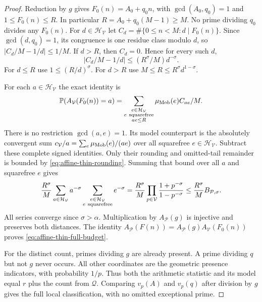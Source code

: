 \documentclass[11pt]{article}
\theoremstyle{definition}
\begin{document}
\begin{proof}
Reduction by $g$ gives $F_0(n)=A_0+q_0n$, with
$\gcd(A_0,q_0)=1$ and $1\le F_0(n)\le R$.
In particular $R=A_0+q_0(M-1)\ge M$.
No prime dividing $q_0$ divides any $F_0(n)$.
For $d\in\mathcal H_{\mathcal V}$ let
$C_d=\#\{0\le n<M:d\mid F_0(n)\}$.
Since $\gcd(d,q_0)=1$, its congruence is one residue class
modulo $d$, so $|C_d/M-1/d|\le1/M$.
If $d>R$, then $C_d=0$.  Hence for every such $d$,
\begin{equation}
 \left|C_d/M-1/d\right|
       \le (R^\sigma/M)d^{-\sigma}.
 \label{eq:affine-thin-rounding}
\end{equation}
For $d\le R$ use $1\le(R/d)^\sigma$.
For $d>R$ use $M\le R\le R^\sigma d^{1-\sigma}$.

For each $a\in\mathcal H_{\mathcal V}$ the exact identity is
\[
 \mathbb P(A_{\mathcal V}(F_0(n))=a)
  =\sum_{\substack{e\in\mathcal H_{\mathcal V}\\
                   e\ {\rm squarefree}\\ae\le R}}
           \mu_{\rm Mob}(e)C_{ae}/M .
\]
There is no restriction $\gcd(a,e)=1$.
Its model counterpart is the absolutely convergent sum
$c_{\mathcal V}/a=\sum_e\mu_{\rm Mob}(e)/(ae)$ over
all squarefree $e\in\mathcal H_{\mathcal V}$.
Subtract these complete signed identities.
Only their rounding and omitted-tail remainder is bounded by
\eqref{eq:affine-thin-rounding}.
Summing that bound over all $a$ and squarefree $e$ gives
\[
 \frac{R^\sigma}{M}
 \sum_{a\in\mathcal H_{\mathcal V}}a^{-\sigma}
 \sum_{\substack{e\in\mathcal H_{\mathcal V}\\e\ {\rm squarefree}}}
                      e^{-\sigma}
 =\frac{R^\sigma}{M}
       \prod_{p\in\mathcal V}
                  \frac{1+p^{-\sigma}}{1-p^{-\sigma}}
 \le\frac{R^\sigma}{M}B_{\mathcal P,\sigma}.
\]
All series converge since $\sigma>\alpha$.
Multiplication by $A_{\mathcal P}(g)$ is injective and preserves
both distances.
The identity
$A_{\mathcal P}(F(n))=A_{\mathcal P}(g)A_{\mathcal V}(F_0(n))$
proves \eqref{eq:affine-thin-full-budget}.

For the distinct count, primes dividing $g$ are already present.
A prime dividing $q$ but not $g$ never occurs.
All other coordinates are the geometric presence indicators,
with probability $1/p$.  Thus both the arithmetic statistic and
its model equal $r$ plus the count from $\mathcal Q$.
Comparing $v_p(A)$ and $v_p(q)$ after division by $g$ gives
the full local classification, with no omitted exceptional prime.
\end{proof}
\end{document}
